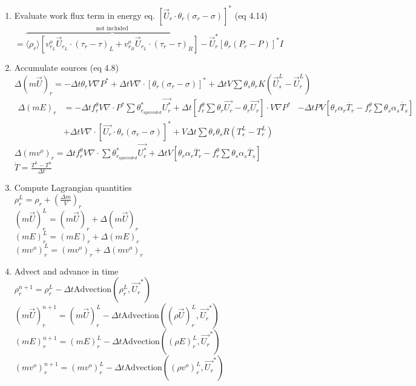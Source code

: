 \documentclass[fleqn]{article}
\newcommand{\delt}          {\ensuremath{\Delta{t}} }
\newcommand{\f}             {\ensuremath{f^{\theta}_r} }
\newcommand{\sv}[1]         {\ensuremath{v^o_{r_{#1}} }}
\begin{document}
\begin{enumerate}
\item Evaluate work flux term in energy eq. $[\vec{U}_r \cdot \theta_r(\sigma_r - \sigma)]^*$ 
      \hspace{ 0.5 in} (eq 4.14)\\
$ = \overbrace{\langle \rho_r\rangle[\sv{L}\vec{U}_{r_L} \cdot {(\tau_r - \tau)_L} 
                        + \sv{R}\vec{U}_{r_L} \cdot {(\tau_r - \tau)_R}] }^{\text{not included}}
                        - \vec{U}^*_r[\theta_r(P_r - P)]^*I$
\item Accumulate sources (eq 4.8)\\  
   $\Delta(m\vec{U})_r = -\delt \theta_r V \nabla P^* 
                         + \delt V\nabla \cdot [\theta_r(\sigma_r - \sigma)]^*
                         + \delt V \sum \theta_s \theta_r K (\vec{U}^L_s - \vec{U}^L_r)$
   \begin{eqnarray*}
   \Delta(mE)_r &= -\delt \f V \nabla \cdot P^* \sum{\theta^*_{r_{upwinded}}\vec{U^*_r}} 
                 + \delt[\f \sum{\theta_r\vec{U_r}} - \theta_r\vec{U_r}] \cdot V \nabla P ^*
                &- \delt P V[\theta_r \alpha_r \dot{T_r} - \f \sum{\theta_s \alpha_s \dot{T_s}}] \\
                &+ \delt V \nabla \cdot [ \vec{U_r} \cdot \theta_r( \sigma_r - \sigma)] ^*
                 + V \delt\sum \theta_r \theta_s R(T^L_s - T^L_r)
   \end{eqnarray*}
  $\Delta(mv^o)_r = \delt \f V \nabla \cdot \sum{\theta^*_{r_{upwinded}}\vec{U^*_r}}
                + \delt V [\theta_r \alpha_r \dot{T_r} 
                - \f \sum{\theta_s \alpha_s \dot{T_s}}] $\\
  $\dot{T} = \frac{T^L - T^n}{\delt}$
\item Compute Lagrangian quantities\\
    $\rho^L_r = \rho_r + (\frac{\Delta{m}}{V})_r$ \\
    $(m \vec{U})^L_r = (m\vec{U})_r + \Delta(m\vec{U})_r$ \\
    $(mE)^L_r = (mE)_r + \Delta(mE)_r $\\
    $(mv^o)^L_r = (mv^o)_r + \Delta(mv^o)_r $\\
\item Advect and advance in time\\
$   \rho^{n+1}_r         = \rho^L_r     - \delt\text{Advection}(\rho^L_r, \vec{U_r}^*)$\\
$   (m\vec{U})^{n+1}_r   = (m\vec{U})^L_r - \delt\text{Advection}((\rho\vec{U})^L_r, \vec{U_r}^*)$\\
$   (mE)^{n+1}_r         = (mE)^L_r       - \delt\text{Advection}((\rho E)^L_r, \vec{U_r}^*) $ \\
$   (mv^o)^{n+1}_r     = (mv^o)^L_r   - \delt\text{Advection}((\rho v^o)^L_r, \vec{U_r}^*) $

\end{enumerate}
\end{document}
